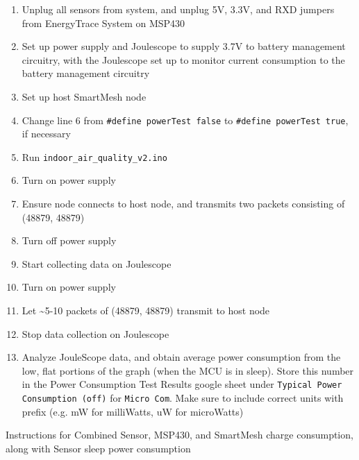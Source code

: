 \begin{enumerate}
\item Unplug all sensors from system, and unplug 5V, 3.3V, and RXD jumpers from EnergyTrace System on MSP430
\item Set up power supply and Joulescope to supply 3.7V to battery management circuitry, with the Joulescope set up to monitor current consumption to the battery management circuitry
\item Set up host SmartMesh node
\item Change line 6 from \texttt{\#define powerTest false} to \texttt{\#define powerTest true}, if necessary
\item Run \texttt{indoor\_air\_quality\_v2.ino}
\item Turn on power supply
\item Ensure node connects to host node, and transmits two packets consisting of (48879, 48879)
\item Turn off power supply
\item Start collecting data on Joulescope
\item Turn on power supply
\item Let \textasciitilde5-10 packets of (48879, 48879) transmit to host node
\item Stop data collection on Joulescope
\item Analyze JouleScope data, and obtain average power consumption from the low, flat portions of the graph (when the MCU is in sleep). Store this number in the Power Consumption Test Results google sheet under \texttt{Typical Power Consumption (off)} for \texttt{Micro Com}. Make sure to include correct units with prefix (e.g. mW for milliWatts, uW for microWatts)

\end{enumerate}
Instructions for Combined Sensor, MSP430, and SmartMesh charge consumption, along with Sensor sleep power consumption
